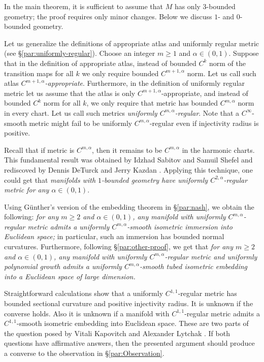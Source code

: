 \documentclass[a4paper,10pt]{article}
\begin{document}
In the main theorem, it is sufficient to assume that $M$ has only $3$-bounded geometry;
the proof requires only minor changes.
Below we discuss $1$- and $0$-bounded geometry.

Let us generalize the definitions of appropriate atlas and uniformly regular metric (see §\ref{par:uniformly-regular}).
Choose an integer $m\ge 1$ and $\alpha\in(0,1)$.
Suppose that in the definition of appropriate atlas,
instead of bounded $C^k$ norm of the transition maps for all $k$ 
we only require bounded $C^{m+1,\alpha}$ norm.
Let us call such atlas \emph{$C^{m+1,\alpha}$-appropriate}.
Furthermore, in the definition of uniformly regular metric let us assume that the atlas is only $C^{m+1,\alpha}$-appropriate, and instead of bounded $C^k$ norm for all $k$,
we only require that metric has bounded $C^{m,\alpha}$ norm in every chart.
Let us call such metrics \emph{uniformly $C^{m,\alpha}$-regular}.
Note that a $C^\infty$-smooth metric might fail to be uniformly $C^{m,\alpha}$-regular even if injectivity radius is positive.

Recall that if metric is $C^{m,\alpha}$, then it remains to be $C^{m,\alpha}$ in the harmonic charts.
This fundamental result was obtained by Idzhad Sabitov and Samuil Shefel \cite{sabitov-shefel} and rediscoved by Dennis DeTurck and Jerry Kazdan \cite{deturck-kazdan}.
Applying this technique, one could get that \textit{manifolds with $1$-bounded geometry have uniformly $C^{2,\alpha}$-regular metric for any $\alpha\in (0,1)$}.

Using Günther's version of the embedding theorem \cite{guenther} in §\ref{par:nash},
we obtain the following: \textit{for any $m\ge 2$ and $\alpha\in(0,1)$, any manifold with uniformly $C^{m,\alpha}$-regular metric admits a uniformly $C^{m,\alpha}$-smooth isometric immersion into Euclidean space;}
in particular, such an immersion has bounded normal curvatures.
Furthermore, following §\ref{par:other-proof}, we get that
\textit{for any $m\ge 2$ and $\alpha\in(0,1)$, any manifold with uniformly $C^{m,\alpha}$-regular metric and uniformly polynomial growth admits a uniformly $C^{m,\alpha}$-smooth tubed isometric embedding into a Euclidean space of large dimension.}

Straightforward calculations show that a uniformly $C^{1,1}$-regular metric has bounded sectional curvature and positive injectivity radius.
It is unknown if the converse holds.
Also it is unknown if a manifold with $C^{1,1}$-regular metric admits a $C^{1,1}$-smooth isometric embedding into Euclidean space.
These are two parts of the question posed by Vitali Kapovitch and Alexander Lytchak \cite[1.10]{kapovitch-lytchak}.
If both questions have affirmative answers, then the presented argument should produce a converse to the observation in §\ref{par:Observation}.
\end{document}
